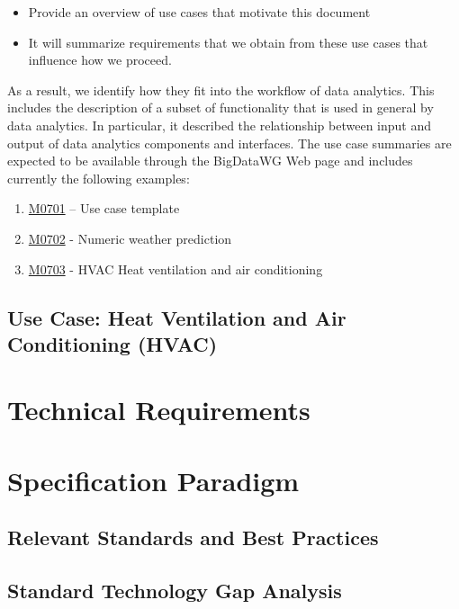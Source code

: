 \documentclass[12pt]{article}
\begin{document}
\begin{itemize}
\item	Provide an overview of use cases that motivate this document
\item	It will summarize requirements that we obtain from these use cases that influence how we proceed.
\end{itemize}

As a result, we identify how they fit into the workflow of data analytics. This includes the description of a subset of functionality that is used in general by data analytics.  In particular, it described the relationship between input and output of data analytics components and interfaces.  The use case summaries are expected to be available through the BigDataWG Web page and includes currently the following examples:

\begin{enumerate}
\item	\href{https://bigdatawg.nist.gov/_uploadfiles/M0701_v1_2020102001.docx}{M0701} – Use case template
\item	\href{https://bigdatawg.nist.gov/_uploadfiles/M0702_v1_2020102002.pdf}{M0702} - Numeric weather prediction
\item	\href{https://bigdatawg.nist.gov/_uploadfiles/M0703_v1_2020102003.pdf}{M0703} - HVAC Heat ventilation and air conditioning 
\end{enumerate}







\subsection{Use Case: Heat Ventilation and Air Conditioning (HVAC)}


\section{Technical Requirements}

\section{Specification Paradigm}

\subsection{Relevant Standards and Best Practices}
\subsection{Standard Technology Gap Analysis}
\end{document}
